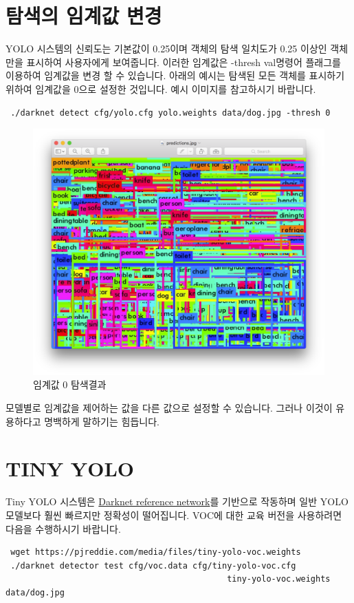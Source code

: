 \documentclass{article}
\begin{document}
\section{탐색의 임계값 변경}
YOLO 시스템의 신뢰도는 기본값이 0.25이며 객체의 탐색 일치도가 0.25 이상인 객체만을 표시하여 사용자에게 보여줍니다.
이러한 임계값은 -thresh \textlangle val\textrangle 명령어 플래그를 이용하여 임계값을 변경 할 수 있습니다. 
아래의 예시는 탐색된 모든 객체를 표시하기 위하여 임계값을 0으로 설정한 것입니다. 예시 이미지를 참고하시기 바랍니다.
\begin{lstlisting}
 ./darknet detect cfg/yolo.cfg yolo.weights data/dog.jpg -thresh 0 
\end{lstlisting}
\begin{figure}[h!]
\centering
\includegraphics[scale=0.2]{eximage.png}
\caption{임계값 0 탐색결과 }
\label{fig:eximg}
\end{figure}

모델별로 임계값을 제어하는 값을 다른 값으로 설정할 수 있습니다. 
그러나 이것이 유용하다고 명백하게 말하기는 힘듭니다.

\section{TINY YOLO}
Tiny YOLO 시스템은 \href{http://khseob0715.dothome.co.kr/YOLO/reference.html}{Darknet reference network}를 기반으로 작동하며 일반 YOLO모델보다 훨씬 빠르지만 정확성이 떨어집니다.
VOC에 대한 교육 버전을 사용하려면 다음을 수행하시기 바랍니다.
\begin{lstlisting}
 wget https://pjreddie.com/media/files/tiny-yolo-voc.weights 
 ./darknet detector test cfg/voc.data cfg/tiny-yolo-voc.cfg 
                                             tiny-yolo-voc.weights data/dog.jpg 
\end{lstlisting}
\end{document}
